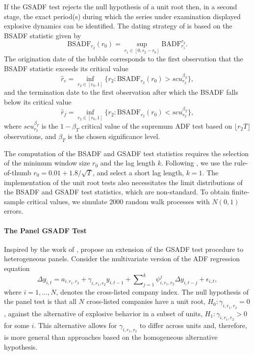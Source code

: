 \documentclass[11pt]{article}
\begin{document}
\begin{appendix}
If the GSADF test rejects the null hypothesis of a unit root then, in a second stage, the exact period(s) during which the series under examination displayed explosive dynamics can be identified. The dating strategy of \citet{PhillipsSY2015a,PhillipsSY2015b} is based on the BSADF statistic given by
\begin{equation}
\text{BSADF}_{r_2}(r_0)= \sup_{r_1 \in [0,r_2-r_0]}{\text{BADF}_{r_1}^{r_2}}.
\end{equation}
The origination date of the bubble corresponds to the first observation that the BSADF statistic exceeds its critical value
\[
\widehat{r}_e= \inf_{r_2 \in [r_0,1]} \{r_2: \text{BSADF}_{r_2}(r_0)>scu_{r_2}^{\beta_T}\},
\]
and the termination date to the first observation after which the BSADF falls below its critical value
\[
\widehat{r}_f= \inf_{r_2 \in [r_0,1]} \{r_2: \text{BSADF}_{r_2}(r_0)<scu_{r_2}^{\beta_T}\},
\]
where $scu_{r_2}^{\beta_T}$ is the $1-\beta_T$ critical value of the supremum ADF test based on $\lfloor  r_2 T \rfloor$ observations, and $\beta_T$ is the chosen significance level. 

The computation of the BSADF and GSADF test statistics requires the selection of the minimum window size $r_0$ and the lag length $k$.  Following \citet{PhillipsSY2015a}, we use the rule-of-thumb $r_0=0.01+1.8/\sqrt{T}$, and select a short lag length, $k=1$. The implementation of the unit root tests also necessitates the limit distributions of the BSADF and GSADF test statistics, which are non-standard. To obtain finite-sample critical values, we simulate 2000 random walk processes with $N(0,1)$ errors. 


\paragraph{The Panel GSADF Test} Inspired by the work of \cite{imPS2003}, \citet{pavlidis2016} propose an extension of the GSADF test procedure to heterogeneous panels. Consider the multivariate version of the ADF regression equation 
\begin{equation}
\Delta y_{i,t}=a_{i,r_{1},r_{2}}+\gamma_{i,r_{1},r_{2}}y_{i,t-1}+%
{\displaystyle\sum\nolimits_{j=1}^{k}}
\psi_{i,r_{1},r_{2}}^{j}\Delta y_{i,t-j}+\epsilon_{i,t},
\end{equation}
where $i=1,\dots,N$, denotes the cross-listed company index. The null hypothesis of the panel test is that all $N$ cross-listed companies have a unit root, $H_{0}:\gamma_{i,r_{1},r_{2}}=0$, against the alternative of explosive behavior in a subset of units, $H_{1}:\gamma_{i,r_{1},r_{2}}>0$ for some $i$. This alternative allows for $\gamma_{i,r_{1},r_{2}}$ to differ across units and, therefore, is more general than approaches based on the homogeneous alternative hypothesis.


\end{appendix}
\end{document}
